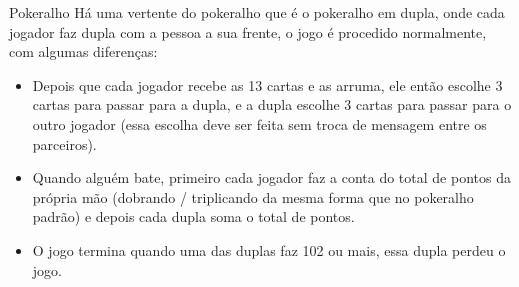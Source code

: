 \begin{subsecao}{Pokeralho}
Há uma vertente do pokeralho que é o pokeralho em dupla, onde cada jogador faz
dupla com a pessoa a sua frente, o jogo é procedido normalmente, com algumas
diferenças: 
\begin{itemize}
\item Depois que cada jogador recebe as 13 cartas e as arruma, ele então
escolhe 3 cartas para passar para a dupla, e a dupla escolhe 3 cartas para
passar para o outro jogador (essa escolha deve ser feita sem troca de mensagem
entre os parceiros). 
\item Quando alguém bate, primeiro cada jogador faz a conta do total de pontos
da própria mão (dobrando / triplicando da mesma forma que no pokeralho padrão)
e depois cada dupla soma o total de pontos. 
\item O jogo termina quando uma das duplas faz 102 ou mais, essa dupla perdeu o
jogo. 

\end{itemize}
\end{subsecao}
